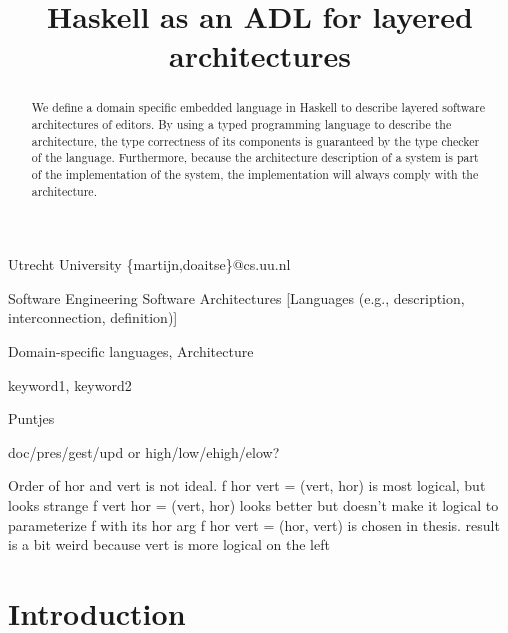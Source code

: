 \documentclass[preprint,natbib]{sigplanconf}
\begin{document}
\copyrightdata{[to be supplied]} 

\preprintfooter{\version}   %

\title{Haskell as an ADL for layered architectures}

           {Utrecht University}
           {\{martijn,doaitse\}@cs.uu.nl}

\maketitle

\begin{abstract}
We define a domain specific embedded language in Haskell to describe
layered software architectures of editors. By using a typed programming
language to describe the architecture, the type correctness of its components
is guaranteed by the type checker of the language. Furthermore, because the
architecture description of a system is part of the implementation of the
system, the implementation will always comply with the architecture.
\end{abstract}

 {Software Engineering}
                  {Software Architectures}
                  [Languages (e.g., description, interconnection, definition)]

\terms
Domain-specific languages, Architecture

\keywords
keyword1, keyword2 



\bc
Puntjes

doc/pres/gest/upd or high/low/ehigh/elow?


Order of hor and vert is not ideal.  
f hor vert = (vert, hor) is most logical, but looks strange
f vert hor = (vert, hor) looks better but doesn't make it logical to parameterize f with its hor arg
f hor vert = (hor, vert) is chosen in thesis. result is a bit weird because vert is more logical on the left

\ec

\section{Introduction}\label{sect:introduction}
\end{document}
